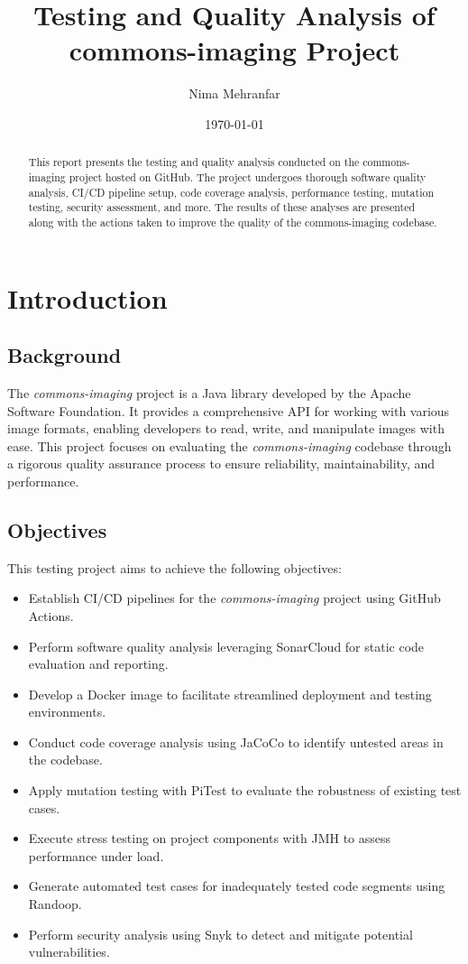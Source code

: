 \documentclass[a4paper,12pt]{report}
\title{Testing and Quality Analysis of commons-imaging Project}
\author{Nima Mehranfar}
\date{\today}
\begin{document}
\maketitle

\begin{abstract}
    This report presents the testing and quality analysis conducted on the commons-imaging project hosted on GitHub. The project undergoes thorough software quality analysis, CI/CD pipeline setup, code coverage analysis, performance testing, mutation testing, security assessment, and more. The results of these analyses are presented along with the actions taken to improve the quality of the commons-imaging codebase.
\end{abstract}

\tableofcontents
\newpage

\chapter{Introduction}
\section{Background}
The \textit{commons-imaging} project is a Java library developed by the Apache Software Foundation. It provides a comprehensive API for working with various image formats, enabling developers to read, write, and manipulate images with ease. This project focuses on evaluating the \textit{commons-imaging} codebase through a rigorous quality assurance process to ensure reliability, maintainability, and performance.

\section{Objectives}
This testing project aims to achieve the following objectives:
\begin{itemize}
    \item Establish CI/CD pipelines for the \textit{commons-imaging} project using GitHub Actions.
    \item Perform software quality analysis leveraging SonarCloud for static code evaluation and reporting.
    \item Develop a Docker image to facilitate streamlined deployment and testing environments.
    \item Conduct code coverage analysis using JaCoCo to identify untested areas in the codebase.
    \item Apply mutation testing with PiTest to evaluate the robustness of existing test cases.
    \item Execute stress testing on project components with JMH to assess performance under load.
    \item Generate automated test cases for inadequately tested code segments using Randoop.
    \item Perform security analysis using Snyk to detect and mitigate potential vulnerabilities.
\end{itemize}
\end{document}
